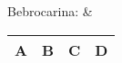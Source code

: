 Bebrocarina: &
\begin{tabular}{|c|c|c|c|}
	\hline 
	\textbf{A} & \textbf{B} & \textbf{C} & \textbf{D} \\
	\hline 
\end{tabular} \\